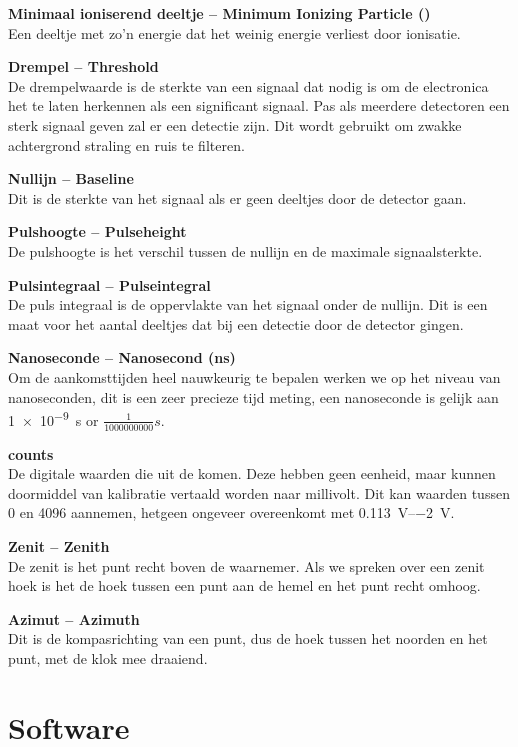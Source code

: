 \textbf{Minimaal ioniserend deeltje -- Minimum Ionizing Particle (\mip)} \\
Een deeltje met zo'n energie dat het weinig energie verliest door
ionisatie.

\textbf{Drempel -- Threshold} \\
De drempelwaarde is de sterkte van een signaal dat nodig is om de
\hisparc electronica het te laten herkennen als een significant signaal. Pas als
meerdere detectoren een sterk signaal geven zal er een detectie zijn.
Dit wordt gebruikt om zwakke achtergrond straling en ruis te filteren.

\textbf{Nullijn -- Baseline} \\
Dit is de sterkte van het signaal als er geen
deeltjes door de detector gaan.

\textbf{Pulshoogte -- Pulseheight} \\
De pulshoogte is het verschil tussen de nullijn en de maximale signaalsterkte.

\textbf{Pulsintegraal -- Pulseintegral} \\
De puls integraal is de oppervlakte van het signaal onder de nullijn.
Dit is een maat voor het aantal deeltjes dat bij een detectie door de
detector gingen.

\textbf{Nanoseconde -- Nanosecond (ns)} \\
Om de aankomsttijden heel nauwkeurig te bepalen werken we op het niveau
van nanoseconden, dit is een zeer precieze tijd meting, een nanoseconde
is gelijk aan \SI{1e-9}{\second} or $\frac{1}{1000000000} s$.

\textbf{\adc counts} \\
De digitale waarden die uit de \adc komen. Deze hebben geen eenheid,
maar kunnen doormiddel van kalibratie vertaald worden naar millivolt.
Dit kan waarden tussen 0 en 4096 aannemen, hetgeen ongeveer overeenkomt met
\SIrange{+0.113}{-2}{\volt}.

\textbf{Zenit -- Zenith} \\
De zenit is het punt recht boven de waarnemer. Als we spreken over een
zenit hoek is het de hoek tussen een punt aan de hemel en het punt recht
omhoog.

\textbf{Azimut -- Azimuth} \\
Dit is de kompasrichting van een punt, dus de hoek tussen het noorden en
het punt, met de klok mee draaiend.


\section{Software}

